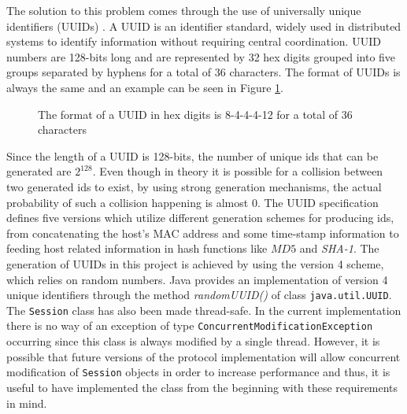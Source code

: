 \documentclass[a4paper,11pt,twoside]{report}
\newcommand{\classname}[1]{\texttt{#1}}
\begin{document}
\begin{description}
The solution to this problem comes through the use of universally unique identifiers (UUIDs) \cite{Leach2005}. A UUID is an identifier standard, widely used in distributed systems to identify information without requiring central coordination. UUID numbers are 128-bits long and are represented by 32 hex digits grouped into five groups separated by hyphens for a total of 36 characters. The format of UUIDs is always the same and an example can be seen in Figure \ref{fig:uuid}.

\begin{figure} [H]
   \centering
     \caption{The format of a UUID in hex digits is 8-4-4-4-12 for a total of 36 characters}
     \label{fig:uuid}
\end{figure}

Since the length of a UUID is 128-bits, the number of unique ids that can be generated are $2^{128}$. Even though in theory it is possible for a collision between two generated ids to exist, by using strong generation mechanisms, the actual probability of such a collision happening is almost 0. The UUID specification defines five versions which utilize different generation schemes for producing ids, from concatenating the host's MAC address and some time-stamp information to feeding host related information in hash functions like $MD5$ and \textit{SHA-1}. The generation of UUIDs in this project is achieved by using the version 4 scheme, which relies on random numbers. Java provides an implementation of version 4 unique identifiers through the method \textit{randomUUID()} of class \classname{java.util.UUID}. \\

The \classname{Session} class has also been made thread-safe. In the current implementation there is no way of an exception of type \classname{ConcurrentModificationException} occurring since this class is always modified by a single thread. However, it is possible that future versions of the protocol implementation will allow concurrent modification of \classname{Session} objects in order to increase performance and thus, it is useful to have implemented the class from the beginning with these requirements in mind.
\end{description}
\end{document}
